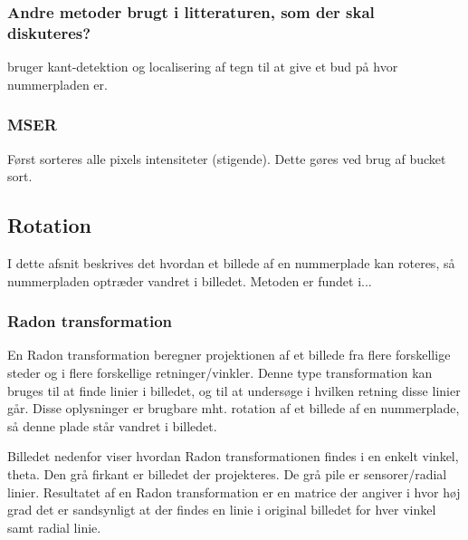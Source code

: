 \subsubsection{Andre metoder brugt i litteraturen, som der skal diskuteres?}

\cite{parker} bruger kant-detektion og localisering af tegn til at give et bud på hvor nummerpladen er.


\subsubsection*{MSER}

Først sorteres alle pixels intensiteter (stigende). Dette gøres ved brug af bucket sort.

\subsection{Rotation}


I dette afsnit beskrives det hvordan et billede af en nummerplade kan roteres, så nummerpladen optræder vandret i billedet. Metoden er fundet i...




\subsubsection*{Radon transformation}

En Radon transformation beregner projektionen af et billede fra flere forskellige steder og i flere forskellige retninger/vinkler. Denne type transformation kan bruges til at finde linier i billedet, og til at undersøge i hvilken retning disse linier går. Disse oplysninger er brugbare mht. rotation af et billede af en nummerplade, så denne plade står vandret i billedet.

Billedet nedenfor viser hvordan Radon transformationen findes i en enkelt vinkel, theta. Den grå firkant er billedet der projekteres. De grå pile er sensorer/radial linier. Resultatet af en Radon transformation er en matrice der angiver i hvor høj grad det er sandsynligt at der findes en linie i original billedet for hver vinkel samt radial linie.

